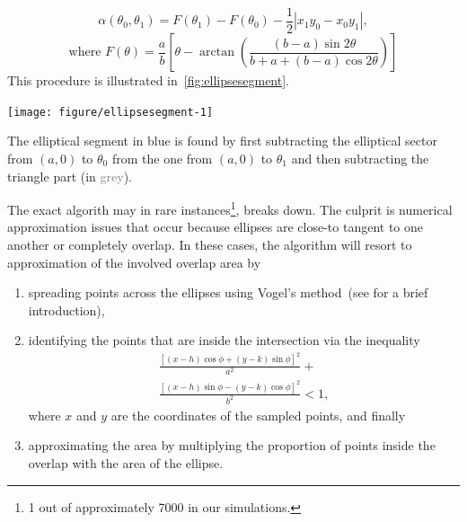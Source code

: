 \documentclass[
  oneside,
  openany,
  numbers=noendperiod,
  parskip=half,
  bibliography=totoc
]{scrbook}\usepackage[]{graphicx}\usepackage{xcolor}
\newenvironment{knitrout}{}{} %
\begin{document}
\begin{equation*}
\alpha(\theta_0, \theta_1) = F(\theta_1) - F(\theta_0) -
\frac{1}{2}\left|x_1y_0 - x_0y_1\right|,
\label{eq:segmentArea}
\end{equation*}
\[
\text{where } F(\theta) = \frac{a}{b}\left[ \theta -
\arctan{\left(\frac{(b - a)\sin{2\theta}}{b + a +(b - a )\cos{2\theta}} \right)}
\right]
\]
This procedure is illustrated in~\cref{fig:ellipsesegment}.

\begin{marginfigure}
\begin{knitrout}\small
{}\color{fgcolor}

{\centering \texttt{[image: figure/ellipsesegment-1]}

}



\end{knitrout}
\caption{The elliptical segment in \textcolor{SteelBlue4}{blue} is found by
first subtracting the elliptical sector from $(a, 0)$ to $\theta_0$ from the one
from $(a, 0)$ to $\theta_1$ and then subtracting the triangle part
(in \textcolor{Grey}{grey}).}
\label{fig:ellipsesegment}
\end{marginfigure}

The exact algorith may in rare instances\footnote{1 out of approximately 7000 in
our simulations.}, breaks down. The culprit is numerical approximation
issues that occur because ellipses are close-to tangent to one another or
completely overlap. In these cases, the algorithm will resort to approximation
of the involved overlap area by
\begin{enumerate}
\item spreading points across the ellipses using Vogel's
  method~(see  for a brief introduction),
\item identifying the points that are inside the intersection via the inequality
  \begin{multline*}
  \frac{\left[(x-h)\cos{\phi}+(y-k)\sin{\phi} \right]^2}{a^2} + \\
    \frac{\left[(x-h) \sin{\phi}-(y-k)\cos{\phi}\right]^2}{b^2} < 1,
  \end{multline*}
  where $x$ and $y$ are the coordinates of the sampled points, and finally
\item approximating the area by multiplying the proportion of points inside the
  overlap with the area of the ellipse.
\end{enumerate}
\end{document}
